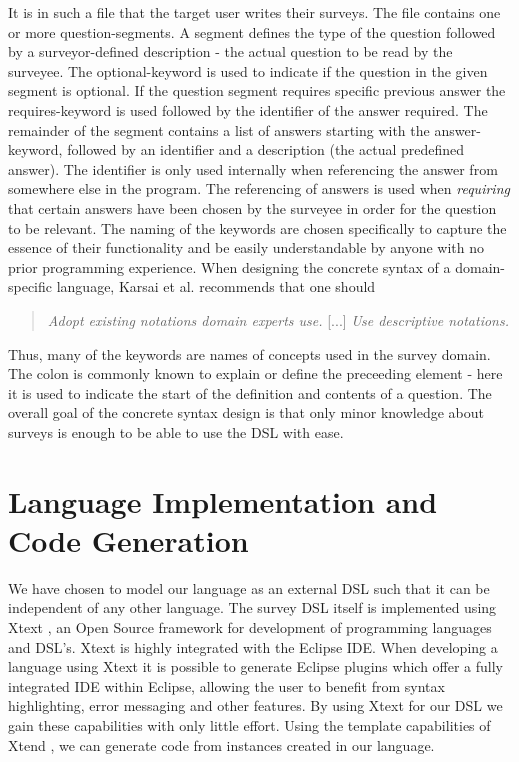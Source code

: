 \documentclass[runningheads]{llncs}
\begin{document}
\noindent
It is in such a file that the target user writes their surveys. The file contains one or more question-segments. A segment defines the type of the question followed by a surveyor-defined description - the actual question to be read by the surveyee. The \textsf{optional}-keyword is used to indicate if the question in the given segment is optional. If the question segment requires specific previous answer the \textsf{requires}-keyword is used followed by the identifier of the answer required. The remainder of the segment contains a list of answers starting with the \textsf{answer}-keyword, followed by an identifier and a description (the actual predefined answer). The identifier is only used internally when referencing the answer from somewhere else in the program. The referencing of answers is used when \emph{requiring} that certain answers have been chosen by the surveyee in order for the question to be relevant. The naming of the keywords are chosen specifically to capture the essence of their functionality and be easily understandable by anyone with no prior programming experience. When designing the concrete syntax of a domain-specific language, Karsai et al. \cite{karsai} recommends that one should
\begin{quotation}
 \emph{Adopt existing notations domain experts use.} [...] \emph{Use descriptive notations.}
\end{quotation}
Thus, many of the keywords are names of concepts used in the survey domain. The colon is commonly known to explain or define the preceeding element - here it is used to indicate the start of the definition and contents of a question. The overall goal of the concrete syntax design is that only minor knowledge about surveys is enough to be able to use the DSL with ease. 

\section{Language Implementation and Code Generation}
We have chosen to model our language as an external DSL such that it can be independent of any other language. The survey DSL itself is implemented using Xtext \cite{xtext}, an Open Source framework for development of programming languages and DSL's. Xtext is highly integrated with the Eclipse IDE. When developing a language using Xtext it is possible to generate Eclipse plugins which offer a fully integrated IDE within Eclipse, allowing the user to benefit from syntax highlighting, error messaging and other features. By using Xtext for our DSL we gain these capabilities with only little effort. Using the template capabilities of Xtend \cite{xtend}, we can generate code from instances created in our language.
\end{document}
